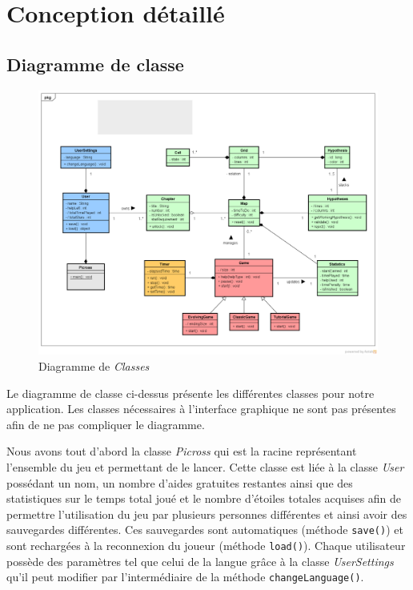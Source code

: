 \documentclass{report}
\begin{document}
\chapter{Conception détaillé}
\thispagestyle{empty}
\thispagestyle{plain}

    \section{Diagramme de classe}
    
    \begin{figure}[H]
	\caption{Diagramme de \textit{Classes}}
	\includegraphics[width=17cm]{../UML/Class_diagram/DiagrammeClasse2b.png}
    \end{figure}
    
    	
	Le diagramme de classe ci-dessus présente les différentes classes pour notre application. Les classes nécessaires à l'interface graphique ne sont pas présentes afin de ne pas compliquer le diagramme.

\bigskip

	Nous avons tout d'abord la classe \textit{Picross} qui est la racine représentant l'ensemble du jeu et permettant de le lancer. Cette classe est liée à la classe \textit{User} possédant un nom, un nombre d'aides gratuites restantes ainsi que des statistiques sur le temps total joué et le nombre d'étoiles totales acquises afin de permettre l'utilisation du jeu par plusieurs personnes différentes et ainsi  avoir des sauvegardes différentes. Ces sauvegardes sont automatiques (méthode \texttt{save()}) et sont rechargées à la reconnexion du joueur (méthode \texttt{load()}). Chaque utilisateur possède des paramètres tel que celui de la langue grâce à la classe \textit{UserSettings} qu'il peut modifier par l'intermédiaire de la méthode \texttt{changeLanguage()}.
	
\end{document}

